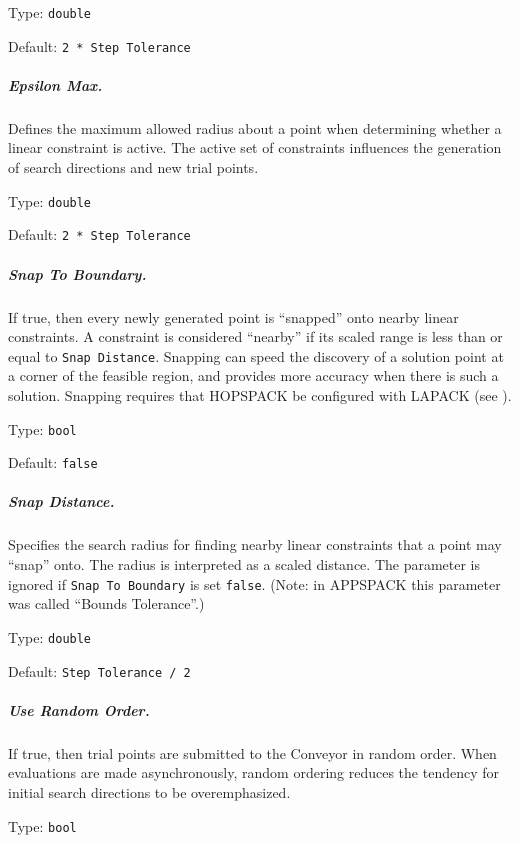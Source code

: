 \hspace{0.2in}
Type: {\tt double}

\hspace{0.2in}
Default: {\tt 2 * Step Tolerance}

\subparagraph{Epsilon Max.}  \label{param:GS-epsmax}
Defines the maximum allowed radius about a point when determining whether a
linear constraint is active.  The active set of constraints influences the
generation of search directions and new trial points.

\hspace{0.2in}
Type: {\tt double}

\hspace{0.2in}
Default: {\tt 2 * Step Tolerance}

\subparagraph{Snap To Boundary.}  \label{param:GS-snap}
If true, then every newly generated point is ``snapped'' onto nearby linear
constraints.  A constraint is considered ``nearby'' if its scaled range is less
than or equal to {\tt Snap Distance}.  Snapping can speed the discovery of a
solution point at a corner of the feasible region, and provides more accuracy
when there is such a solution.  Snapping requires that HOPSPACK be configured
with LAPACK (see ).

\hspace{0.2in}
Type: {\tt bool}

\hspace{0.2in}
Default: {\tt false}

\subparagraph{Snap Distance.}  \label{param:GS-snapdist}
Specifies the search radius for finding nearby linear constraints that a point
may ``snap'' onto.  The radius is interpreted as a scaled distance.
The parameter is ignored if {\tt Snap To Boundary} is set {\tt false}.
(Note:  in APPSPACK this parameter was called ``Bounds Tolerance''.)

\hspace{0.2in}
Type: {\tt double}

\hspace{0.2in}
Default: {\tt Step Tolerance / 2}

\subparagraph{Use Random Order.}  \label{param:GS-random}
If true, then trial points are submitted to the Conveyor in random order.
When evaluations are made asynchronously, random ordering reduces the
tendency for initial search directions to be overemphasized.

\hspace{0.2in}
Type: {\tt bool}

